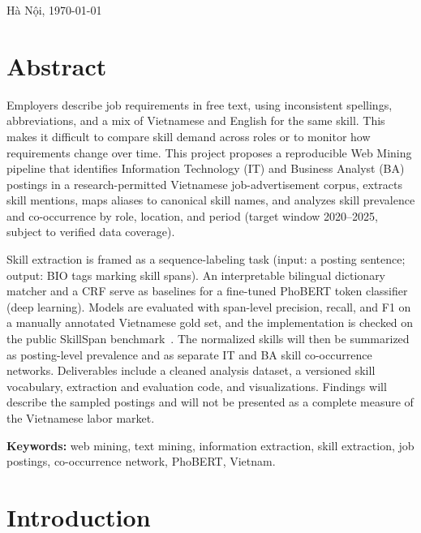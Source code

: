 \documentclass[12pt,a4paper]{article}
\newcommand{\Place}{Hà Nội}
\newcommand{\SubmitDate}{\today}
\begin{document}
\begin{titlepage}
  \vfill
  {\large \Place, \SubmitDate\par}
\end{titlepage}

\tableofcontents
\clearpage
{}

\section*{Abstract}

Employers describe job requirements in free text, using inconsistent
spellings, abbreviations, and a mix of Vietnamese and English for the same
skill. This makes it difficult to compare skill demand across roles or to
monitor how requirements change over time. This project proposes a
reproducible Web Mining pipeline that identifies Information Technology (IT)
and Business Analyst (BA) postings in a research-permitted Vietnamese
job-advertisement corpus, extracts skill mentions, maps aliases to canonical
skill names, and analyzes skill prevalence and co-occurrence by role,
location, and period (target window 2020--2025, subject to verified data
coverage).

Skill extraction is framed as a sequence-labeling task (input: a posting
sentence; output: BIO tags marking skill spans). An interpretable bilingual
dictionary matcher and a CRF serve as baselines for a fine-tuned PhoBERT
token classifier (deep learning). Models are evaluated with span-level
precision, recall, and F1 on a manually annotated Vietnamese gold set, and
the implementation is checked on the public SkillSpan
benchmark~\cite{skillspan}. The
normalized skills will then be summarized as posting-level prevalence and as
separate IT and BA skill co-occurrence networks. Deliverables include a
cleaned analysis dataset, a versioned skill vocabulary, extraction and
evaluation code, and visualizations. Findings will describe the sampled
postings and will not be presented as a complete measure of the Vietnamese
labor market.

\textbf{Keywords:} web mining, text mining, information extraction, skill
extraction, job postings, co-occurrence network, PhoBERT, Vietnam.

\section{Introduction}\label{sec:intro}
\end{document}
